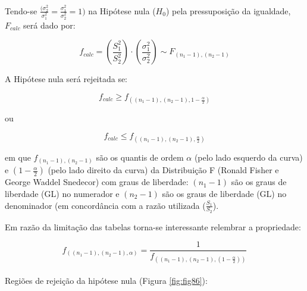 \documentclass[
]{book}
\begin{document}
Tendo-se \(\frac{({\sigma }_{2}^{2}}{{\sigma }_{1}^2}=\frac{{\sigma }_{1}^{2}}{{\sigma }_{2}^2}=1)\) na Hipótese nula (\(H_{0}\)) pela pressuposição da igualdade, \(F_{calc}\) será dado por:

\hfill\break

\[
f_{calc} =  (\frac{{S}_{1}^{2}}{{S}_{2}^{2}})\cdot (\frac{{\sigma }_{1}^{2}}{{\sigma }_{2}^2}) \sim F_{(n_{1} -1), (n_{2} -1)}
\]

A Hipótese nula será rejeitada se:

\hfill\break
\[
f_{calc} \ge f_{((n_{1} -1), (n_{2} -1), 1-\frac{\alpha}{2})} 
\]

ou

\[
f_{calc} \le f_{((n_{1} -1), (n_{2} -1), \frac{\alpha}{2})}
\]

\hfill\break

em que \({f}_{({n}_{1}-1),({n}_{2}-1)}\) são os quantis de ordem \(\alpha\) (pelo lado esquerdo da curva) e \((1-\frac{\alpha}{2})\) (pelo lado direito da curva) da Distribuição F (Ronald Fisher e George Waddel Snedecor) com graus de liberdade: \((n_{1}-1)\) são os graus de liberdade (GL) no numerador e \((n_{2}-1)\) são os graus de liberdade (GL) no denominador (em concordância com a razão utilizada (\(\frac{S_{1}}{S_{2}}\)).

\hfill\break

Em razão da limitação das tabelas torna-se interessante relembrar a propriedade:

\hfill\break

\[
{f}_{(({n}_{1}-1),({n}_{2}-1), \alpha)} = \frac{1}{ {f}_{(({n}_{1}-1),({n}_{2}-1), (1-\frac{\alpha}{2}))}  }
\]\\

Regiões de rejeição da hipótese nula (Figura \ref{fig:fig86}):
\end{document}
